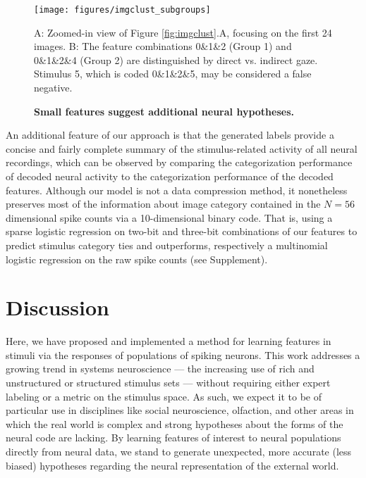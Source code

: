 \documentclass[12pt,a4paper]{article}
\begin{document}
\begin{figure}[!ht]
    \texttt{[image: figures/imgclust\_subgroups]}
	\caption{\bf Small features suggest additional neural hypotheses.}
	A: Zoomed-in view of Figure \ref{fig:imgclust}.A, focusing on the first 24 images. B: The feature combinations 0\&1\&2 (Group 1) and 0\&1\&2\&4 (Group 2) are distinguished by direct vs. indirect gaze. Stimulus 5, which is coded 0\&1\&2\&5, may be considered a false negative.
	\label{fig:imgclust_sub}
\end{figure}

An additional feature of our approach is that the generated labels provide a concise and fairly complete summary of the stimulus-related activity of all neural recordings, which can be observed by comparing the categorization performance of decoded neural activity to the categorization performance of the decoded features. Although our model is not a data compression method, it nonetheless preserves most of the information about image category contained in the $N=56$ dimensional spike counts via a 10-dimensional binary code. That is, using a sparse logistic regression on two-bit and three-bit combinations of our features to predict stimulus category ties and outperforms, respectively a multinomial logistic regression on the raw spike counts (see Supplement).

\section*{Discussion}

Here, we have proposed and implemented a method for learning features in stimuli via the responses of populations of spiking neurons. This work addresses a growing trend in systems neuroscience --- the increasing use of rich and unstructured or structured stimulus sets --- without requiring either expert labeling or a metric on the stimulus space. As such, we expect it to be of particular use in disciplines like social neuroscience, olfaction, and other areas in which the real world is complex and strong hypotheses about the forms of the neural code are lacking. By learning features of interest to neural populations directly from neural data, we stand to generate unexpected, more accurate (less biased) hypotheses regarding the neural representation of the external world.
\end{document}
